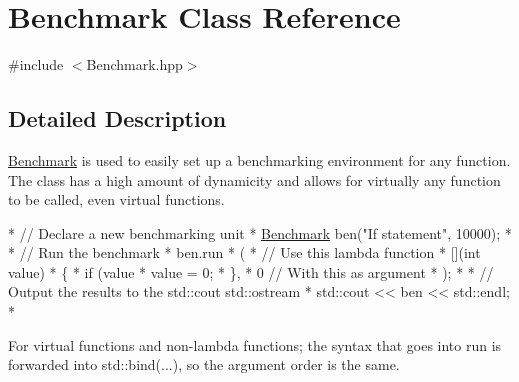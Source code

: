 \hypertarget{class_benchmark}{\section{Benchmark Class Reference}
\label{class_benchmark}
}


{\ttfamily \#include $<$Benchmark.\-hpp$>$}



\subsection{Detailed Description}
\hyperlink{class_benchmark}{Benchmark} is used to easily set up a benchmarking environment for any function. The class has a high amount of dynamicity and allows for virtually any function to be called, even virtual functions.


\begin{DoxyCode}
*  \textcolor{comment}{// Declare a new benchmarking unit}
*  \hyperlink{class_benchmark}{Benchmark} ben(\textcolor{stringliteral}{"If statement"}, 10000);
* 
*  \textcolor{comment}{// Run the benchmark}
*  ben.run
*  (
*      \textcolor{comment}{// Use this lambda function}
*      [](\textcolor{keywordtype}{int} value)
*      \{
*          \textcolor{keywordflow}{if} (value %
*              value = 0;
*      \},
*      0 \textcolor{comment}{// With this as argument}
*  );
* 
*  \textcolor{comment}{// Output the results to the std::cout std::ostream}
*  std::cout << ben << std::endl;
*  
\end{DoxyCode}


For virtual functions and non-\/lambda functions; the syntax that goes into run is forwarded into std\-::bind(...), so the argument order is the same.


